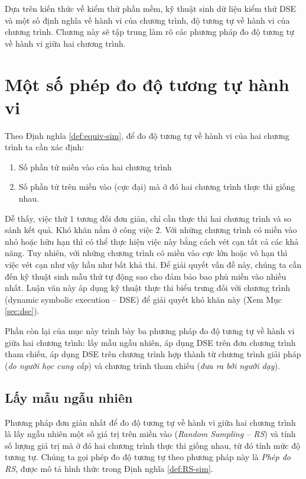 Dựa trên kiến thức về kiểm thử phần mềm, kỹ thuật sinh dữ liệu 
kiểm thử DSE và một số định nghĩa về hành vi của chương trình, độ tương 
tự về hành vi của chương trình. Chương này sẽ tập trung làm rõ các phương 
pháp đo độ tương tự về hành vi giữa hai chương trình. 

\section{Một số phép đo độ tương tự hành vi}
\label{sec:metrics}

Theo Định nghĩa \ref{def:equiv-sim}, để đo độ tương tự về hành vi của
hai chương trình ta cần xác định:
\begin{enumerate}
\item Số phần tử miền vào của hai chương trình
\item Số phần tử trên miền vào (cực đại) mà ở đó hai chương trình thực thi giống nhau.
\end{enumerate}
Dễ thấy, việc thứ $1$ tương đối đơn giản, chỉ cần thực thi hai
chương trình và so sánh kết quả. Khó khăn nằm ở công việc $2$. Với
những chương trình có miền vào nhỏ hoặc hữu hạn thì có thể thực hiện
việc này bằng cách vét cạn tất cả các khả năng. Tuy nhiên, với những
chương trình có miền vào cực lớn hoặc vô hạn thì việc vét cạn như vậy
hầu như bất khả thi. Để giải quyết vấn đề này, chúng ta cần đến kỹ
thuật sinh mẫu thử tự động sao cho đảm bảo bao phủ miền vào nhiều
nhất. Luận văn này áp dụng kỹ thuật thực thi biểu trưng đối với chương
trình (dynamic symbolic execution -- DSE) để giải quyết khó khăn này
(Xem Mục \ref{sec:dse}).

Phần còn lại của mục này trình bày ba phương pháp đo độ tương tự về
hành vi giữa hai chương trình: lấy mẫu ngẫu nhiên, áp dụng DSE trên
đơn chương trình tham chiếu, áp dụng DSE trên chương trình hợp thành
từ chương trình giải pháp (\emph{do người học cung cấp}) và chương
trình tham chiếu (\emph{đưa ra bởi người dạy}).

\subsection{Lấy mẫu ngẫu nhiên}

Phương pháp đơn giản nhất để đo độ tương tự về hành vi giữa hai chương
trình là lấy ngẫu nhiên một số giá trị trên miền vào (\emph{Random
  Sampling -- RS}) và tính số lượng giá trị mà ở đó hai chương trình
thực thi giống nhau, từ đó tính mức độ tương tự. Chúng ta gọi phép đo
độ tương tự theo phương pháp này là \emph{Phép đo RS}, được mô tả hình thức
trong Định nghĩa \ref{def:RS-sim}.


